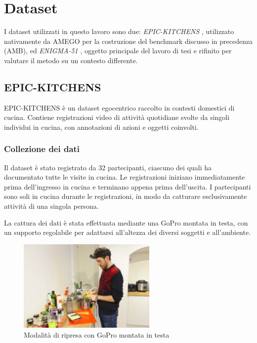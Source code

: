 \chapter{Dataset}

I dataset utilizzati in questo lavoro sono due: \emph{EPIC-KITCHENS} \cite{Damen2021PAMI}, utilizzato nativamente da AMEGO per la costruzione del benchmark discusso in precedenza (AMB), ed \emph{ENIGMA-51} \cite{ragusa2023enigma51}, oggetto principale del lavoro di tesi e rifinito per valutare il metodo su un contesto differente.

\section{EPIC-KITCHENS}
EPIC-KITCHENS è un dataset egocentrico raccolto in contesti domestici di cucina. Contiene registrazioni video di attività quotidiane svolte da singoli individui in cucina, con annotazioni di azioni e oggetti coinvolti. 

\subsection*{Collezione dei dati}
Il dataset è stato registrato da 32 partecipanti, ciascuno dei quali ha documentato tutte le visite in cucina. Le registrazioni iniziano immediatamente prima dell'ingresso in cucina e terminano appena prima dell'uscita. I partecipanti sono soli in cucina durante le registrazioni, in modo da catturare esclusivamente attività di una singola persona.  

La cattura dei dati è stata effettuata mediante una GoPro montata in testa, con un supporto regolabile per adattarsi all'altezza dei diversi soggetti e all'ambiente.  

\begin{figure}[ht]
    \centering
    \includegraphics[width=0.6\textwidth]{Images/goproepic.png}
    \caption{Modalità di ripresa con GoPro montata in testa}
\end{figure}

